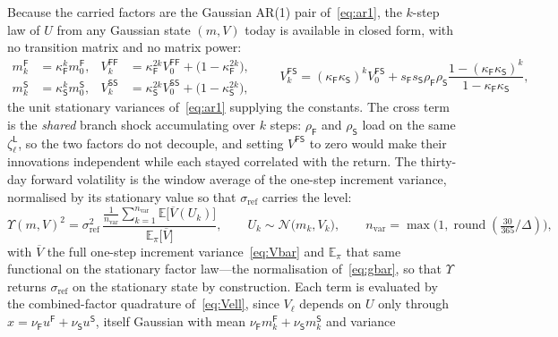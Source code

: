 \documentclass[11pt]{article}
\newcommand{\E}{\mathbb{E}}
\newcommand{\cN}{\mathcal{N}}
\providecommand{\1}{\mathbf 1}
\begin{document}
Because the carried factors are the Gaussian \textup{AR(1)} pair of~\eqref{eq:ar1}, the $k$-step
law of $U$ from any Gaussian state $(m,V)$ today is available in closed form, with no transition
matrix and no matrix power:
\begin{equation}\label{eq:kstep}
\begin{aligned}
  m^{\mathsf F}_k&=\kappa_{\mathsf F}^{k}m^{\mathsf F}_0, &
  V^{\mathsf{FF}}_k&=\kappa_{\mathsf F}^{2k}V^{\mathsf{FF}}_0+\bigl(1-\kappa_{\mathsf F}^{2k}\bigr),\\
  m^{\mathsf S}_k&=\kappa_{\mathsf S}^{k}m^{\mathsf S}_0, &
  V^{\mathsf{SS}}_k&=\kappa_{\mathsf S}^{2k}V^{\mathsf{SS}}_0+\bigl(1-\kappa_{\mathsf S}^{2k}\bigr),
\end{aligned}
\qquad
  V^{\mathsf{FS}}_k=(\kappa_{\mathsf F}\kappa_{\mathsf S})^{k}V^{\mathsf{FS}}_0
   +s_{\mathsf F}s_{\mathsf S}\rho_{\mathsf F}\rho_{\mathsf S}
    \frac{1-(\kappa_{\mathsf F}\kappa_{\mathsf S})^{k}}{1-\kappa_{\mathsf F}\kappa_{\mathsf S}},
\end{equation}
the unit stationary variances of~\eqref{eq:ar1} supplying the constants. The cross term is the
\emph{shared} branch shock accumulating over $k$ steps: $\rho_{\mathsf F}$ and $\rho_{\mathsf S}$
load on the same $\zeta^{\mathsf L}_\ell$, so the two factors do not decouple, and setting
$V^{\mathsf{FS}}$ to zero would make their innovations independent while each stayed correlated with
the return. The thirty-day forward volatility is the window average of the one-step increment variance,
normalised by its stationary value so that $\sigma_{\mathrm{ref}}$ carries the level:
\begin{equation}\label{eq:fwdvar}
  \Upsilon(m,V)^2=\sigma_{\mathrm{ref}}^{2}\,
    \frac{\frac{1}{n_{\mathrm{var}}}\sum_{k=1}^{n_{\mathrm{var}}}\E\bigl[\overline V(U_k)\bigr]}
         {\E_\pi\bigl[\overline V\bigr]},
  \qquad U_k\sim\cN\bigl(m_k,V_k\bigr),
  \qquad n_{\mathrm{var}}=\max\bigl(1,\operatorname{round}(\tfrac{30}{365}/\Delta)\bigr),
\end{equation}
with $\overline V$ the full one-step increment variance~\eqref{eq:Vbar} and $\E_\pi$ that same
functional on the stationary factor law---the normalisation of~\eqref{eq:gbar}, so that $\Upsilon$
returns $\sigma_{\mathrm{ref}}$ on the stationary state by construction. Each
term is evaluated by the combined-factor quadrature of~\eqref{eq:Vell}, since $V_\ell$ depends on
$U$ only through $x=\nu_{\mathsf F}u^{\mathsf F}+\nu_{\mathsf S}u^{\mathsf S}$, itself Gaussian with
mean $\nu_{\mathsf F}m^{\mathsf F}_k+\nu_{\mathsf S}m^{\mathsf S}_k$ and variance
\end{document}
